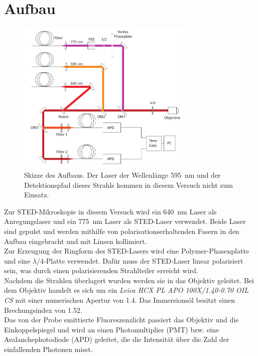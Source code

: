 \section{Aufbau}
\begin{figure}
	\centering
	\includegraphics[width=0.75\textwidth]{plots/aufbau.png}
	\caption{Skizze des Aufbaus. Der Laser der Wellenlänge 595~nm und der Detektionspfad dieses Strahls kommen in diesem Versuch nicht zum Einsatz.}
\end{figure}
Zur STED-Mikroskopie in diesem Versuch wird ein 640~nm Laser als Anregungslaser und ein 775~nm Laser als STED-Laser verwendet.
Beide Laser sind gepulst und werden mithilfe von polarisationserhaltenden Fasern in den Aufbau eingebracht und mit Linsen kollimiert.
\\
Zur Erzeugung der Ringform des STED-Lasers wird eine Polymer-Phasenplatte und eine $\lambda/4$-Platte verwendet.
Dafür muss der STED-Laser linear polarisiert sein, was durch einen polarisierenden Strahlteiler erreicht wird.
\\
Nachdem die Strahlen überlagert wurden werden sie in das Objektiv geleitet.
Bei dem Objektiv handelt es sich um ein \emph{Leica HCX PL APO 100X/1.40-0.70 OIL CS} mit einer numerischen Apertur von 1.4. 
Das Immersionsöl besitzt einen Brechungsindex von 1.52.
\\
Das von der Probe emittierte Fluoreszenzlicht passiert das Objektiv und die Einkoppelspiegel und wird an einen Photomultiplier (PMT) bzw. eine Avalanchephotodiode (APD) geleitet, die die Intensität über die Zahl der einfallenden Photonen misst.

